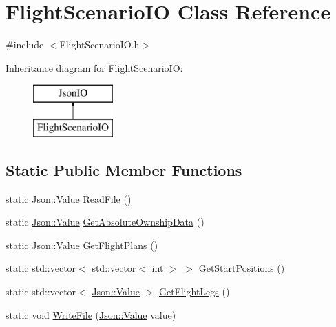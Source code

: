 \hypertarget{class_flight_scenario_i_o}{}\section{Flight\+Scenario\+I\+O Class Reference}
\label{class_flight_scenario_i_o}


{\ttfamily \#include $<$Flight\+Scenario\+I\+O.\+h$>$}

Inheritance diagram for Flight\+Scenario\+I\+O\+:\begin{figure}[H]
\begin{center}
\leavevmode
\includegraphics[height=2.000000cm]{class_flight_scenario_i_o}
\end{center}
\end{figure}
\subsection*{Static Public Member Functions}
\begin{DoxyCompactItemize}
\item 
static \hyperlink{class_json_1_1_value}{Json\+::\+Value} \hyperlink{class_flight_scenario_i_o_aecbc4f1b1b7f894e5492869b97e0fe80}{Read\+File} ()
\item 
static \hyperlink{class_json_1_1_value}{Json\+::\+Value} \hyperlink{class_flight_scenario_i_o_ac59acd7bc4300bfe2a9e89e0b5bf3552}{Get\+Absolute\+Ownship\+Data} ()
\item 
static \hyperlink{class_json_1_1_value}{Json\+::\+Value} \hyperlink{class_flight_scenario_i_o_a7754b53451b1fada9abde7fbc76d6f1c}{Get\+Flight\+Plans} ()
\item 
static std\+::vector$<$ std\+::vector$<$ int $>$ $>$ \hyperlink{class_flight_scenario_i_o_af72948757583488975e1282dfdd3e8a4}{Get\+Start\+Positions} ()
\item 
static std\+::vector$<$ \hyperlink{class_json_1_1_value}{Json\+::\+Value} $>$ \hyperlink{class_flight_scenario_i_o_a0d16fc884060e675aef902c37ee2b274}{Get\+Flight\+Legs} ()
\item 
static void \hyperlink{class_flight_scenario_i_o_ab8652a866e50bae73dd3be2cf4f92920}{Write\+File} (\hyperlink{class_json_1_1_value}{Json\+::\+Value} value)
\end{DoxyCompactItemize}
